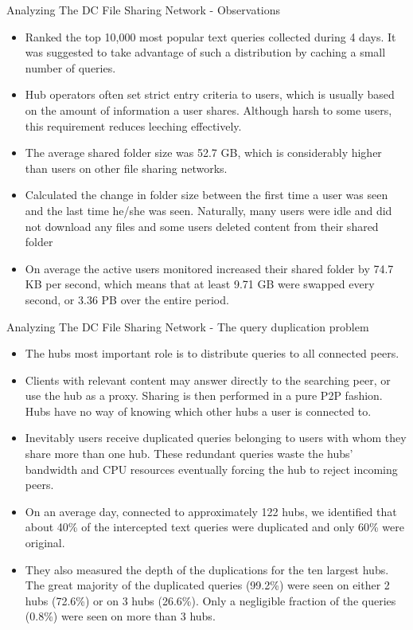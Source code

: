 \documentclass[9pt]{beamer}
\begin{document}
\begin{frame}{Analyzing The DC File Sharing Network - Observations}
    \begin{itemize}
       \item Ranked the top 10,000 most popular text queries collected during 4 days. It was suggested to take advantage of such a distribution by caching a small number of queries.
       \item Hub operators often set strict entry criteria to users, which is usually based on the amount of information a user shares. Although harsh to some users, this requirement reduces leeching effectively.
       \item The average shared folder size was 52.7 GB, which is considerably higher than users on other file sharing networks.
        \item Calculated the change in folder size between the first time a user was seen and the last time he/she was seen. Naturally, many users were idle and did not download any files and some users deleted content from their shared folder
        \item On average the active users monitored increased their shared folder by 74.7 KB per second, which means that at least 9.71 GB were swapped every second, or 3.36 PB over the entire period. 
    \end{itemize}
\end{frame}
\begin{frame}{Analyzing The DC File Sharing Network - The query duplication problem}
    \begin{itemize}
    \item The hubs most important role is to distribute queries to all connected peers. \item Clients with relevant content may answer directly to the searching peer, or use the hub as a proxy. Sharing is then performed in a pure P2P fashion. Hubs have no way of knowing which other hubs a user is connected to. 
    \item Inevitably users receive duplicated queries belonging to users with whom they share more than one hub. These redundant queries waste the hubs’ bandwidth and CPU resources eventually forcing the hub to reject incoming peers.
    \item On an average day, connected to approximately 122 hubs, we identified that about 40\% of the intercepted text queries were duplicated and only 60\% were original.
    \item They also measured the depth of the duplications for the ten largest hubs. The great majority of the duplicated queries (99.2\%) were seen on either 2 hubs (72.6\%) or on 3 hubs (26.6\%). Only a negligible fraction of the queries (0.8\%) were seen on more than 3 hubs.
    \end{itemize}
\end{frame}
\end{document}
